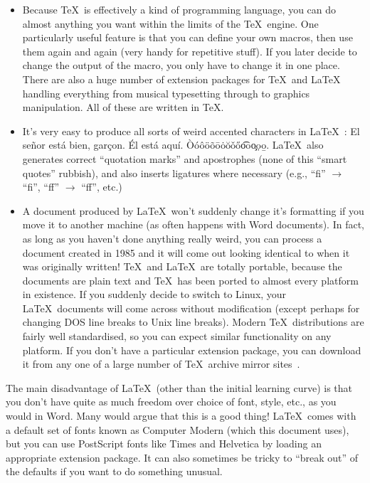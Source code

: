 \documentclass[12pt,a4paper,pdftex]{article}
\begin{document}
\begin{itemize}
	\item Because \TeX\ is effectively a kind of programming language, you can do almost anything you want within the limits of the \TeX\ engine. One particularly useful feature is that you can define your own macros, then use them again and again (very handy for repetitive stuff). If you later decide to change the output of the macro, you only have to change it in one place. There are also a huge number of extension packages for \TeX\ and \LaTeX\, handling everything from musical typesetting through to graphics manipulation. All of these are written in \TeX.
	
	\item It's very easy to produce all sorts of weird accented characters in \LaTeX~\cite{UsersGuide}: El se\~{n}or est\'{a} bien, gar\c{c}on. \'{E}l est\'{a} aqu\'{i}. \`{O}\'{o}\^{o}\"{o}\~{o}\={o}\.{o}\u{o}\v{o}\H{o}\t{oo}\c{o}\d{o}\b{o}. \LaTeX\ also generates correct ``quotation marks'' and apostrophes (none of this ``smart quotes'' rubbish), and also inserts ligatures where necessary (e.g., ``f{}i'' \(\rightarrow\) ``fi'', ``f{}f'' \(\rightarrow\) ``ff'', etc.)
	
	\item A document produced by \LaTeX\ won't suddenly change it's formatting if you move it to another machine (as often happens with Word documents). In fact, as long as you haven't done anything really weird, you can process a document created in 1985 and it will come out looking identical to when it was originally written! \TeX\ and \LaTeX\ are totally portable, because the documents are plain text and \TeX\ has been ported to almost every platform in existence. If you suddenly decide to switch to Linux, your \LaTeX\ documents will come across without modification (except perhaps for changing DOS line breaks to Unix line breaks). Modern \TeX\ distributions are fairly well standardised, so you can expect similar functionality on any platform. If you don't have a particular extension package, you can download it from any one of a large number of \TeX\ archive mirror sites~\cite{CTAN}.

\end{itemize}

The main disadvantage of \LaTeX\ (other than the initial learning curve) is that you don't have quite as much freedom over choice of font, style, etc., as you would in Word. Many would argue that this is a good thing! \LaTeX\ comes with a default set of fonts known as Computer Modern (which this document uses), but you can use PostScript fonts like {\selectfont Times} and {\selectfont Helvetica} by loading an appropriate extension package. It can also sometimes be tricky to ``break out'' of the defaults if you want to do something unusual.
\end{document}
